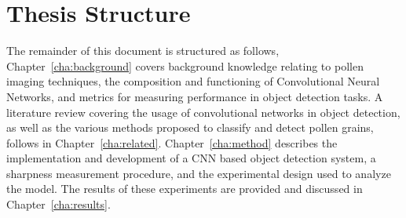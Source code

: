 \section{Thesis Structure}\label{sec:intro-thesis-structure}
The remainder of this document is structured as follows,
Chapter~\ref{cha:background} covers background knowledge relating to pollen imaging techniques, the composition and functioning of Convolutional Neural Networks, and metrics for measuring performance in object detection tasks.
A literature review covering the usage of convolutional networks in object detection, as well as the various methods proposed to classify and detect pollen grains, follows in Chapter~\ref{cha:related}.
Chapter~\ref{cha:method} describes the implementation and development of a CNN based object detection system, a sharpness measurement procedure, and the experimental design used to analyze the model.
The results of these experiments are provided and discussed in Chapter~\ref{cha:results}.
